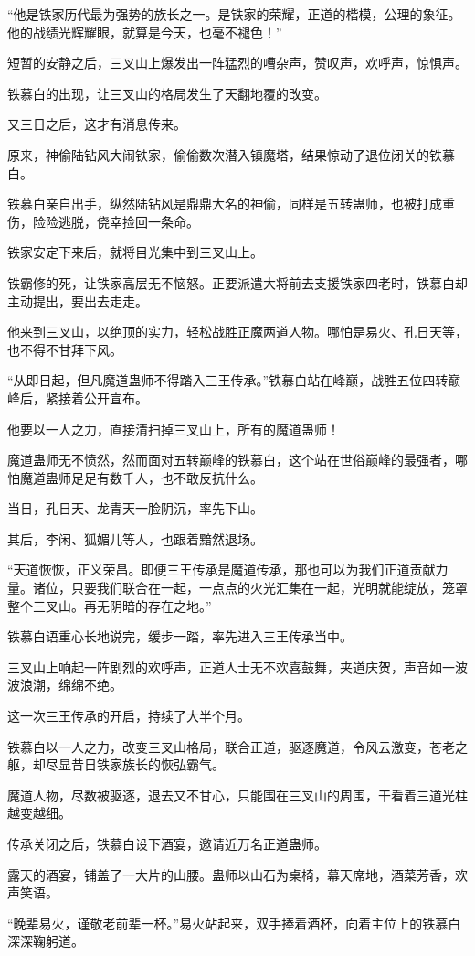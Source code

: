 \begin{this_body}
“他是铁家历代最为强势的族长之一。是铁家的荣耀，正道的楷模，公理的象征。他的战绩光辉耀眼，就算是今天，也毫不褪色！”

短暂的安静之后，三叉山上爆发出一阵猛烈的嘈杂声，赞叹声，欢呼声，惊惧声。

铁慕白的出现，让三叉山的格局发生了天翻地覆的改变。

又三日之后，这才有消息传来。

原来，神偷陆钻风大闹铁家，偷偷数次潜入镇魔塔，结果惊动了退位闭关的铁慕白。

铁慕白亲自出手，纵然陆钻风是鼎鼎大名的神偷，同样是五转蛊师，也被打成重伤，险险逃脱，侥幸捡回一条命。

铁家安定下来后，就将目光集中到三叉山上。

铁霸修的死，让铁家高层无不恼怒。正要派遣大将前去支援铁家四老时，铁慕白却主动提出，要出去走走。

他来到三叉山，以绝顶的实力，轻松战胜正魔两道人物。哪怕是易火、孔日天等，也不得不甘拜下风。

“从即日起，但凡魔道蛊师不得踏入三王传承。”铁慕白站在峰巅，战胜五位四转巅峰后，紧接着公开宣布。

他要以一人之力，直接清扫掉三叉山上，所有的魔道蛊师！

魔道蛊师无不愤然，然而面对五转巅峰的铁慕白，这个站在世俗巅峰的最强者，哪怕魔道蛊师足足有数千人，也不敢反抗什么。

当日，孔日天、龙青天一脸阴沉，率先下山。

其后，李闲、狐媚儿等人，也跟着黯然退场。

“天道恢恢，正义荣昌。即便三王传承是魔道传承，那也可以为我们正道贡献力量。诸位，只要我们联合在一起，一点点的火光汇集在一起，光明就能绽放，笼罩整个三叉山。再无阴暗的存在之地。”

铁慕白语重心长地说完，缓步一踏，率先进入三王传承当中。

三叉山上响起一阵剧烈的欢呼声，正道人士无不欢喜鼓舞，夹道庆贺，声音如一波波浪潮，绵绵不绝。

这一次三王传承的开启，持续了大半个月。

铁慕白以一人之力，改变三叉山格局，联合正道，驱逐魔道，令风云激变，苍老之躯，却尽显昔日铁家族长的恢弘霸气。

魔道人物，尽数被驱逐，退去又不甘心，只能围在三叉山的周围，干看着三道光柱越变越细。

传承关闭之后，铁慕白设下酒宴，邀请近万名正道蛊师。

露天的酒宴，铺盖了一大片的山腰。蛊师以山石为桌椅，幕天席地，酒菜芳香，欢声笑语。

“晚辈易火，谨敬老前辈一杯。”易火站起来，双手捧着酒杯，向着主位上的铁慕白深深鞠躬道。


\end{this_body}
